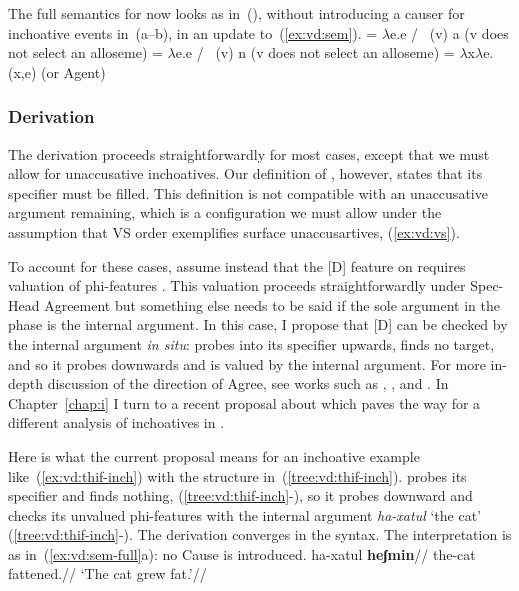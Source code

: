 The full semantics for {\vd} now looks as in~(\nextx), without introducing a causer for inchoative events in~(\nextx a--b), in an update to~(\ref{ex:vd:sem}).
\pex\label{ex:vd:sem-full}
	\a \denote{\vd} = $\lambda$e.e / \trace~(v) a \hfill (v does not select an alloseme)
	\a \denote{\vd} = $\lambda$e.e / \trace~(v) n \hfill (v does not select an alloseme)
	\a \denote{\vd} = $\lambda$x$\lambda$e.(x,e) \hfill (or Agent)
\xe


		\subsubsection{Derivation}
The derivation proceeds straightforwardly for most cases, except that we must allow for unaccusative inchoatives. Our definition of {\vd}, however, states that its specifier must be filled. This definition is not compatible with an unaccusative argument remaining, which is a configuration we must allow under the assumption that VS order exemplifies surface unaccusartives, (\ref{ex:vd:vs}).

To account for these cases, assume instead that the [D] feature on {\vd} requires valuation of phi-features \citep{nie17,schaefer17oup}. This valuation proceeds straightforwardly under Spec-Head Agreement but something else needs to be said if the sole argument in the phase is the internal argument. In this case, I propose that [D] can be checked by the internal argument \emph{in situ}: {\vd} probes into its specifier upwards, finds no target, and so it probes downwards and is valued by the internal argument. For more in-depth discussion of the direction of Agree, see works such as \cite{bejarrezac09}, \cite{zeijlstra12}, \cite{preminger13tlr} and \cite{deal15nels}. In Chapter~\ref{chap:i} I turn to a recent proposal about {\vd} which paves the way for a different analysis of inchoatives in {\thif}.

Here is what the current proposal means for an inchoative example like~(\ref{ex:vd:thif-inch}) with the structure in~(\ref{tree:vd:thif-inch}). {\vd} probes its specifier and finds nothing, (\ref{tree:vd:thif-inch}-), so it probes downward and checks its unvalued phi-features with the internal argument \emph{ha-xatul} `the cat' (\ref{tree:vd:thif-inch}-). The derivation converges in the syntax. The interpretation is as in~(\ref{ex:vd:sem-full}a): no Cause is introduced.
\ex\label{ex:vd:thif-inch} \begingl
	\gla ha-xatul \textbf{heʃmin}//
	\glb the-cat fattened.//
	\glft `The cat grew fat.'//
	\endgl
\xe
	
